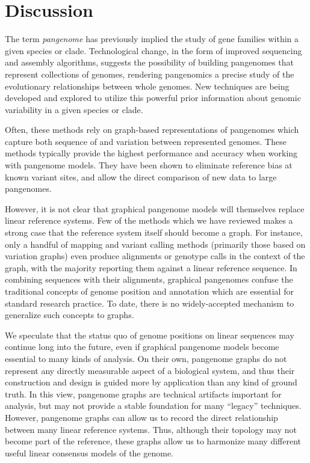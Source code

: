 \section{Discussion}
\label{sec:discussion}

The term \emph{pangenome} has previously implied the study of gene families within a given species or clade.
Technological change, in the form of improved sequencing and assembly algorithms, suggests the possibility of building pangenomes that represent collections of genomes, rendering pangenomics a precise study of the evolutionary relationships between whole genomes.
New techniques are being developed and explored to utilize this powerful prior information about genomic variability in a given species or clade.

Often, these methods rely on graph-based representations of pangenomes which capture both sequence of and variation between represented genomes.
These methods typically provide the highest performance and accuracy when working with pangenome models.
They have been shown to eliminate reference bias at known variant sites, and allow the direct comparison of new data to large pangenomes.

However, it is not clear that graphical pangenome models will themselves replace linear reference systems.
Few of the methods which we have reviewed makes a strong case that the reference system itself should become a graph.
For instance, only a handful of mapping and variant calling methods (primarily those based on variation graphs) even produce alignments or genotype calls in the context of the graph, with the majority reporting them against a linear reference sequence.
In combining sequences with their alignments, graphical pangenomes confuse the traditional concepts of genome position and annotation which are essential for standard research practice.
To date, there is no widely-accepted mechanism to generalize such concepts to graphs.

We speculate that the status quo of genome positions on linear sequences may continue long into the future, even if graphical pangenome models become essential to many kinds of analysis.
On their own, pangenome graphs do not represent any directly measurable aspect of a biological system, and thus their construction and design is guided more by application than any kind of ground truth.
In this view, pangenome graphs are technical artifacts important for analysis, but may not provide a stable foundation for many ``legacy'' techniques.
However, pangenome graphs can allow us to record the direct relationship between many linear reference systems.
Thus, although their topology may not become part of the reference, these graphs allow us to harmonize many different useful linear consensus models of the genome.

